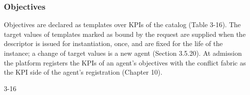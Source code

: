 \hypertarget{objectives}{%
\subsubsection{Objectives}\label{objectives}}

Objectives are declared as templates over KPIs of the catalog (Table
3-16). The target values of templates marked as bound by the request are
supplied when the descriptor is issued for instantiation, once, and are
fixed for the life of the instance; a change of target values is a new
agent (Section 3.5.20). At admission the platform registers the KPIs of
an agent's objectives with the conflict fabric as the KPI side of the
agent's registration (Chapter 10).

\begin{wptable}{3-16}


\end{wptable}
